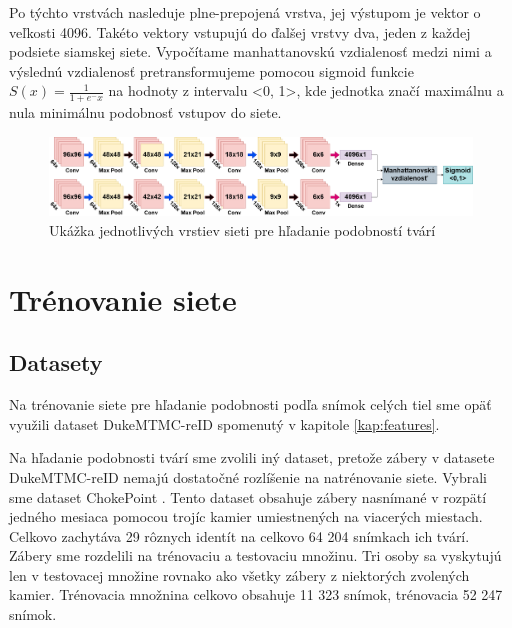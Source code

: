 Po týchto vrstvách nasleduje plne-prepojená vrstva, jej výstupom je vektor o veľkosti 4096.
Takéto vektory vstupujú do ďalšej vrstvy dva, jeden z každej podsiete siamskej siete.
Vypočítame manhattanovskú vzdialenosť medzi nimi a výslednú vzdialenosť pretransformujeme pomocou sigmoid funkcie $S(x) = \frac{1}{1 + e^-x}$ na hodnoty z intervalu <0, 1>, 
kde jednotka značí maximálnu a nula minimálnu podobnosť vstupov do siete.

\begin{figure}[H]
\centerline{\includegraphics[width=1\textwidth]{images/siamese_architecture}}
\caption[Architektúra siete pre hľadanie podobností tvárí]{Ukážka jednotlivých vrstiev sieti pre hľadanie podobností tvárí}
\label{obr:siamese_architecture}
\end{figure}

\section{Trénovanie siete} \label{kap:siamese_train}
\subsection{Datasety}
Na trénovanie siete pre hľadanie podobnosti podľa snímok celých tiel sme opäť využili dataset DukeMTMC-reID \cite{ristani2016MTMC} \cite{zheng2017unlabeled} spomenutý v kapitole \ref{kap:features}.

Na hľadanie podobnosti tvárí sme zvolili iný dataset, pretože zábery v datasete DukeMTMC-reID nemajú dostatočné rozlíšenie na natrénovanie siete.
Vybrali sme dataset ChokePoint \cite{wong_cvprw_2011}. 
Tento dataset obsahuje zábery nasnímané v rozpätí jedného mesiaca pomocou trojíc kamier umiestnených na viacerých miestach.
Celkovo zachytáva 29 rôznych identít na celkovo 64 204 snímkach ich tvárí.
Zábery sme rozdelili na trénovaciu a testovaciu množinu.
Tri osoby sa vyskytujú len v testovacej množine rovnako ako všetky zábery z niektorých zvolených kamier.
Trénovacia množnina celkovo obsahuje 11 323 snímok, trénovacia 52 247 snímok.

